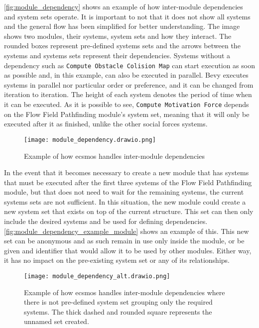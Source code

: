 \documentclass[twoside, 11pt]{article}
\begin{document}
\autoref{fig:module_dependency} shows an example of how inter-module dependencies and system sets operate. It is important to not that it does not show all systems and the general flow has been simplified for better understanding. The image shows two modules, their systems, system sets and how they interact. The rounded boxes represent pre-defined systems sets and the arrows between the systems and systems sets represent their dependencies. Systems without a dependency such as \verb|Compute Obstacle Colision Map| can start execution as soon as possible and, in this example, can also be executed in parallel. Bevy executes systems in parallel nor particular order or preference, and it can be changed from iteration to iteration. The height of each system denotes the period of time when it can be executed. As it is possible to see, \verb|Compute Motivation Force| depends on the Flow Field Pathfinding module's system set, meaning that it will only be executed after it as finished, unlike the other social forces systems.

\begin{figure}[h]
  \centering
  \texttt{[image: module\_dependency.drawio.png]}
  \caption{Example of how \gls{ecsmos} handles inter-module dependencies}
  \label{fig:module_dependency}
\end{figure}

In the event that it becomes necessary to create a new module that has systems that must be executed after the first three systems of the Flow Field Pathfinding module, but that does not need to wait for the remaining systems, the current systems sets are not sufficient. In this situation, the new module could create a new system set that exists on top of the current structure. This set can then only include the desired systems and be used for defining dependencies. 
\autoref{fig:module_dependency_example_module} shows an example of this. This new set can be anonymous and as such remain in use only inside the module, or be given and identifier that would allow it to be used by other modules. Either way, it has no impact on the pre-existing system set or any of its relationships.

\begin{figure}[h]
  \centering
  \texttt{[image: module\_dependency\_alt.drawio.png]}
  \caption{Example of how \gls{ecsmos} handles inter-module dependencies where there is not pre-defined system set grouping only the required systems. The thick dashed and rounded square represents the unnamed set created.}
  \label{fig:module_dependency_example_module}
\end{figure}
\end{document}

